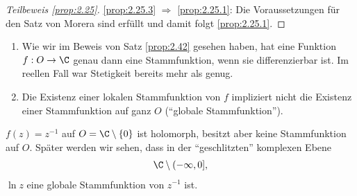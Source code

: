 \begin{proof}[Teilbeweis \ref{prop:2.25}]
\ref{prop:2.25.3} $\Rightarrow$ \ref{prop:2.25.1}: Die Voraussetzungen für den
Satz von Morera sind erfüllt und damit folgt \ref{prop:2.25.1}.\qedhere
\end{proof}

\begin{bem}[Bemerkungen]
\label{bem:2.43}
\begin{enumerate}
  \item Wie wir im Beweis von Satz \ref{prop:2.42} gesehen haben, hat eine
  Funktion $f: O\to\C$ genau dann eine Stammfunktion, wenn sie differenzierbar
  ist. Im reellen Fall war Stetigkeit bereits mehr als genug.
  \item Die Existenz einer lokalen Stammfunktion von $f$ impliziert nicht die
  Existenz einer Stammfunktion auf ganz $O$ (``globale Stammfunktion'').\maphere
\end{enumerate}
\end{bem}
 \begin{bspn}
  $f(z)=z^{-1}$ auf $O = \C\setminus\{0\}$ ist holomorph, besitzt aber keine
  Stammfunktion auf $O$. Später werden wir sehen, dass in der ``geschlitzten''
  komplexen Ebene
  \begin{align*}
  \C \setminus(-\infty,0],
  \end{align*}
   $\ln z$ eine globale Stammfunktion von $z^{-1}$ ist.\bsphere
  \end{bspn}

